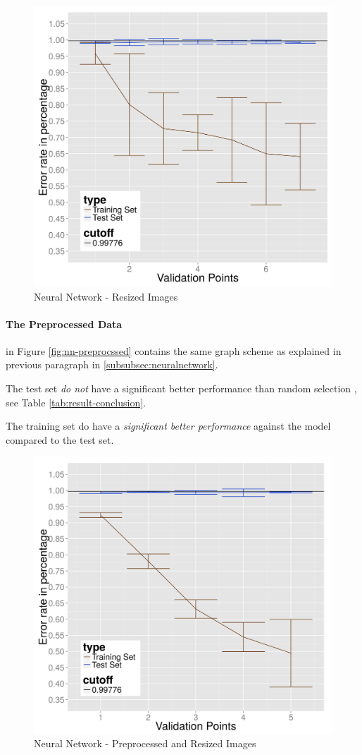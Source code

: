 \begin{figure}
  \centering
  \includegraphics[width=0.9\linewidth]{Images/DNNraw}
  \caption{Neural Network - Resized Images}
  \label{fig:nn-resized}
\end{figure}

\paragraph{The Preprocessed Data}
in Figure \ref{fig:nn-preprocssed} contains the same graph scheme as explained in previous paragraph in \ref{subsubsec:neuralnetwork}. 

The test set \emph{do not} have a significant better performance than random selection
, see Table \ref{tab:result-conclusion}.

The training set do have a \emph{significant better performance} against the model compared to the test set.

\begin{figure}
  \centering
  \includegraphics[width=0.9\linewidth]{Images/DNNpreprocessed}
  \caption{Neural Network - Preprocessed and Resized Images}
  \label{fig:nn-preprocessed}
\end{figure}

